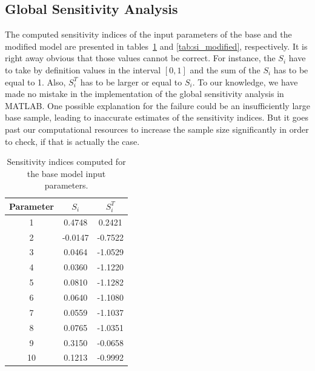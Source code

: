 \documentclass[11pt]{article}
\begin{document}
\subsection{Global Sensitivity Analysis}
The computed sensitivity indices of the input parameters of the base and the modified model are presented in tables~\ref{tab:si_base} and \ref{tab:si_modified}, respectively. It is right away obvious that those values cannot be correct. For instance, the $S_i$ have to take by definition values in the interval $[0,1]$ and the sum of the $S_i$ has to be equal to 1. Also, $S_i^T$ has to be larger or equal to $S_i$. To our knowledge, we have made no mistake in the implementation of the global sensitivity analysis in MATLAB. One possible explanation for the failure could be an insufficiently large base sample, leading to inaccurate estimates of the sensitivity indices. But it goes past our computational resources to increase the sample size significantly in order to check, if that is actually the case.
\begin{table}[!htbp]
	\centering
	\caption{Sensitivity indices computed for the base model input parameters.}
	\vspace{0.5 cm}
		\begin{tabular}{c | c | c}
		Parameter & $S_i$ & $S_i^T$\\
		\hline
		1 & 0.4748 & 0.2421\\
		2 & -0.0147 & -0.7522\\
		3 & 0.0464 & -1.0529\\
		4 & 0.0360 & -1.1220\\
		5 & 0.0810 & -1.1282\\
		6 & 0.0640 & -1.1080\\
		7 & 0.0559 & -1.1037\\
		8 & 0.0765 & -1.0351\\
		9 & 0.3150 & -0.0658\\
		10 & 0.1213 & -0.9992\\
	\end{tabular}
	\label{tab:si_base}
\end{table}
\end{document}
